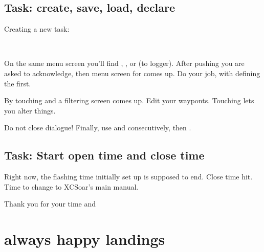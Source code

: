 \documentclass[english,a4paper,12pt]{refrep}
\newcommand{\nav}[3]{\bmenut{Nav}{#1/2}{\LARGE$\triangleright$}~\bmenut{#2}{#3}}%
\begin{document}
\subsection{\textcolor{flashblue}{Task: create, save, load, declare}}
Creating a new task:
\begin{flushleft}\hspace*{1cm}\nav{1}{Task}{}\blink{}\blink{}\\\end{flushleft}
\begin{compactitem}
\item On the same menu screen you'll find , , or 
 (to logger). After pushing  you are asked to
acknowledge, then menu screen for  comes up. Do your job, with 
defining the  first.
\item By touching  and  a filtering 
screen  comes up. Edit your wayponts. Touching 
 lets you alter things.
\item Do not close dialogue! Finally, use  and  
consecutively, then .
\end{compactitem}

\subsection*{\textcolor{flashblue}{Task: Start open time and close time}}
Right now, the flashing time initially set up is supposed to end.
Close time hit. Time to change to XCSoar's main manual.

Thank you for your time and


\section*{always happy landings}%


\end{document}
